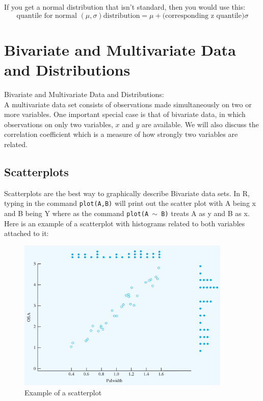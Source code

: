 \documentclass{article}
\newcommand{\code}[1]{\texttt{#1}} %
\begin{document}
	If you get a normal distribution that isn't standard, then you would use this:
	\[ \text{quantile for normal }(\mu , \sigma) \text{distribution} = \mu + \text{(corresponding z 
	quantile)}\sigma \]
	
	

\clearpage	
\section{Bivariate and Multivariate Data and Distributions} %
Bivariate and Multivariate Data and Distributions: \\
	
A multivariate data set consists of observations made simultaneously on two or more variables. 
One important special case is that of bivariate data, in which observations on only two 
variables, $x$ and $y$  are available. We will also discuss the correlation coefficient which is a 
measure of how strongly two variables are related.
	
	\subsection{Scatterplots} %
	Scatterplots are the best way to graphically describe Bivariate data sets. In R, typing in the 
	command \code{plot(A,B)} will print out the scatter plot with A being x and B being Y where 
	as the command \code{plot(A $\sim$ B)} treats A as y and B as x. Here is an example of a 
	scatterplot with histograms related to both variables attached to it:
	\begin{figure}[!htb]
	   \centering
	   \includegraphics[width=4in]{NotesChap3_1.jpg} 
	   \caption{Example of a scatterplot}
	   \label{fig:example_scatterplot}
	\end{figure}
	
\end{document}
